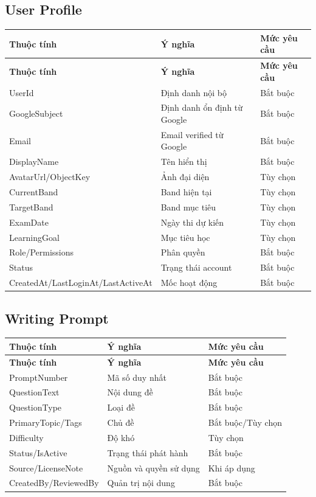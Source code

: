 \documentclass[11pt,a4paper]{article}
\begin{document}
\subsection{User Profile}
\small
\setlength{\tabcolsep}{4pt}
\renewcommand{\arraystretch}{1.18}
\begin{longtable}{|P{0.28\textwidth}|P{0.45\textwidth}|P{0.19\textwidth}|}
\hline
\textbf{Thuộc tính} & \textbf{Ý nghĩa} & \textbf{Mức yêu cầu} \\ \hline
\endfirsthead
\hline
\textbf{Thuộc tính} & \textbf{Ý nghĩa} & \textbf{Mức yêu cầu} \\ \hline
\endhead
UserId & Định danh nội bộ & Bắt buộc \\ \hline
GoogleSubject & Định danh ổn định từ Google & Bắt buộc \\ \hline
Email & Email verified từ Google & Bắt buộc \\ \hline
DisplayName & Tên hiển thị & Bắt buộc \\ \hline
AvatarUrl/\allowbreak{}ObjectKey & Ảnh đại diện & Tùy chọn \\ \hline
CurrentBand & Band hiện tại & Tùy chọn \\ \hline
TargetBand & Band mục tiêu & Tùy chọn \\ \hline
ExamDate & Ngày thi dự kiến & Tùy chọn \\ \hline
LearningGoal & Mục tiêu học & Tùy chọn \\ \hline
Role/\allowbreak{}Permissions & Phân quyền & Bắt buộc \\ \hline
Status & Trạng thái account & Bắt buộc \\ \hline
CreatedAt/\allowbreak{}LastLoginAt/\allowbreak{}LastActiveAt & Mốc hoạt động & Bắt buộc \\ \hline
\end{longtable}
\normalsize
\subsection{Writing Prompt}
\small
\setlength{\tabcolsep}{4pt}
\renewcommand{\arraystretch}{1.18}
\begin{longtable}{|P{0.28\textwidth}|P{0.45\textwidth}|P{0.19\textwidth}|}
\hline
\textbf{Thuộc tính} & \textbf{Ý nghĩa} & \textbf{Mức yêu cầu} \\ \hline
\endfirsthead
\hline
\textbf{Thuộc tính} & \textbf{Ý nghĩa} & \textbf{Mức yêu cầu} \\ \hline
\endhead
PromptNumber & Mã số duy nhất & Bắt buộc \\ \hline
QuestionText & Nội dung đề & Bắt buộc \\ \hline
QuestionType & Loại đề & Bắt buộc \\ \hline
PrimaryTopic/\allowbreak{}Tags & Chủ đề & Bắt buộc/\allowbreak{}Tùy chọn \\ \hline
Difficulty & Độ khó & Tùy chọn \\ \hline
Status/\allowbreak{}IsActive & Trạng thái phát hành & Bắt buộc \\ \hline
Source/\allowbreak{}LicenseNote & Nguồn và quyền sử dụng & Khi áp dụng \\ \hline
CreatedBy/\allowbreak{}ReviewedBy & Quản trị nội dung & Bắt buộc \\ \hline
\end{longtable}
\normalsize
\end{document}
